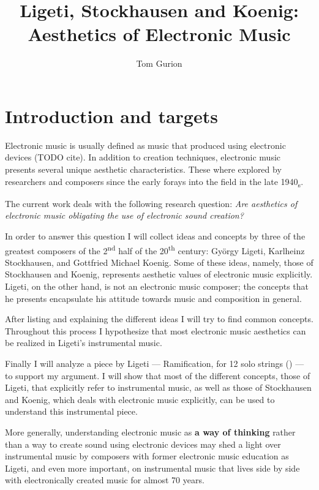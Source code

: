 \documentclass[a4paper,11pt]{article}
\title{Ligeti, Stockhausen and Koenig:\\Aesthetics of Electronic Music}
\author{Tom Gurion}
\begin{document}
\maketitle
\tableofcontents

\section{Introduction and targets}
\label{sec:introduction}

Electronic music is usually defined as music that produced using electronic devices (TODO cite).
In addition to creation techniques, electronic music presents several unique aesthetic characteristics.
These where explored by researchers and composers since the early forays into the field in the late 1940\textsubscript{s}.

The current work deals with the following research question:
\emph{Are aesthetics of electronic music obligating the use of electronic sound creation?}

In order to answer this question I will collect ideas and concepts by three of the greatest composers of the 2\textsuperscript{nd} half of the 20\textsuperscript{th} century: Gy{\"o}rgy Ligeti, Karlheinz Stockhausen, and Gottfried Michael Koenig.
Some of these ideas, namely, those of Stockhausen and Koenig, represents aesthetic values of electronic music explicitly.
Ligeti, on the other hand, is not an electronic music composer;
the concepts that he presents encapsulate his attitude towards music and composition in general.

After listing and explaining the different ideas I will try to find common concepts.
Throughout this process I hypothesize that most electronic music aesthetics can be realized in Ligeti's instrumental music.

Finally I will analyze a piece by Ligeti --- Ramification, for 12 solo strings (\cite{rami}) --- to support my argument.
I will show that most of the different concepts, those of Ligeti, that explicitly refer to instrumental music, as well as those of Stockhausen and Koenig, which deals with electronic music explicitly, can be used to understand this instrumental piece.

More generally, understanding electronic music as \textbf{a way of thinking} rather than a way to create sound using electronic devices may shed a light over instrumental music by composers with former electronic music education as Ligeti, and even more important, on instrumental music that lives side by side with electronically created music for almost 70 years.
\end{document}
